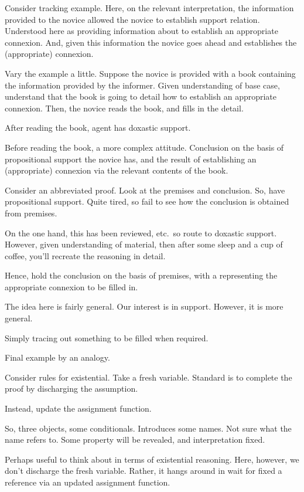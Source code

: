 \begin{note}
  Consider tracking example.
  Here, on the relevant interpretation, the information provided to the novice allowed the novice to establish support relation.
  Understood here as providing information about to establish an appropriate connexion.
  And, given this information the novice goes ahead and establishes the (appropriate) connexion.

  Vary the example a little.
  Suppose the novice is provided with a book containing the information provided by the informer.
  Given understanding of base case, understand that the book is going to detail how to establish an appropriate connexion.
  Then, the novice reads the book, and fills in the detail.

  After reading the book, agent has doxastic support.

  Before reading the book, a more complex attitude.
  Conclusion on the basis of propositional support the novice has, and the result of establishing an (appropriate) connexion via the relevant contents of the book.
\end{note}

\begin{note}
  Consider an abbreviated proof.
  Look at the premises and conclusion.
  So, have propositional support.
  Quite tired, so fail to see how the conclusion is obtained from premises.

  On the one hand, this has been reviewed, etc.\ so route to doxastic support.
  However, given understanding of material, then after some sleep and a cup of coffee, you'll recreate the reasoning in detail.

  Hence, hold the conclusion on the basis of premises, with a \future{} representing the appropriate connexion to be filled in.

  
\end{note}

\begin{note}
  The idea here is fairly general.
  Our interest is in support.
  However, it is more general.

  Simply tracing out something to be filled when required.
\end{note}

\begin{note}
  Final example by an analogy.

  Consider rules for existential.
  Take a fresh variable.
  Standard is to complete the proof by discharging the assumption.

  Instead, update the assignment function.

  So, three objects, some conditionals.
  Introduces some names.
  Not sure what the name refers to.
  Some property will be revealed, and interpretation fixed.
  
  Perhaps useful to think about in terms of existential reasoning.
  Here, however, we don't discharge the fresh variable.
  Rather, it hangs around in wait for fixed a reference via an updated assignment function.
\end{note}

